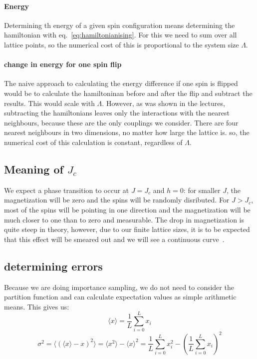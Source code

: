 \documentclass{scrartcl}
\begin{document}
\paragraph{Energy}
Determining th energy of a given spin configuration means determining the hamiltonian with eq.~\ref{eq:hamiltonianising}. For this we need to sum over all lattice points, so the numerical cost of this is proportional to the system size $\Lambda$.

\paragraph{change in energy for one spin flip}
The naive approach to calculating the energy difference if one spin is flipped would be to calculate the hamiltoninan before and after the flip and subtract the results. This would scale with $\Lambda$. However, as was shown in the lectures, subtracting the hamiltonians leaves only the interactions with the nearest neighbours, because these are the only couplings we consider. There are four nearest neighbours in two dimensions, no matter how large the lattice is. so, the numerical cost of this calculation is constant, regardless of $\Lambda$.

\subsection{Meaning of $J_c$} 
We expect a phase transition to occur at $J=J_c$ and $h=0$: for smaller $J$, the magnetization will be zero and the spins will be randomly disributed. For $J>J_c$, most of the spins will be pointing in one direction and the magnetization will be much closer to one than to zero and measurable. The drop in magnetization is quite steep in theory, however, due to our finite lattice sizes, it is to be expected that this effect will be smeared out and we will see a continuous curve~\cite{YangMagnetization}\cite{binderheermann}.

\subsection{determining errors}

Because we are doing importance sampling, we do not need to consider the partition function and can calculate expectation values as simple arithmetic means. This gives us:
\begin{equation}
\langle x\rangle=\frac{1}{L}\sum_{i=0}^{L} x_i
\end{equation}
\begin{equation}
\sigma^2=\langle (\langle x\rangle-x)^2\rangle=\langle x^2\rangle-\langle x\rangle^2=\frac{1}{L}\sum_{i=0}^{L} x_i^2-\left( \frac{1}{L}\sum_{i=0}^{L} x_i\right) ^2
\end{equation}
\end{document}
